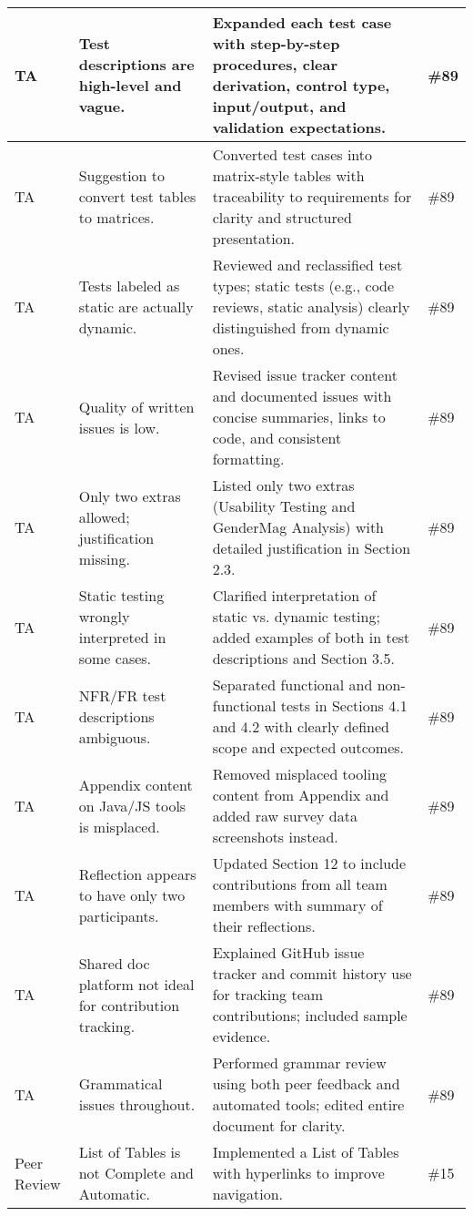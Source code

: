 \documentclass{article}
\begin{document}
\begin{longtable}{|p{2cm}|p{5cm}|p{5cm}|p{2cm}|}
\hline
TA & Test descriptions are high-level and vague. & Expanded each test case with step-by-step procedures, clear derivation, control type, input/output, and validation expectations. & \#89 \\
\hline
TA & Suggestion to convert test tables to matrices. & Converted test cases into matrix-style tables with traceability to requirements for clarity and structured presentation. & \#89 \\
\hline
TA & Tests labeled as static are actually dynamic. & Reviewed and reclassified test types; static tests (e.g., code reviews, static analysis) clearly distinguished from dynamic ones. & \#89 \\
\hline
TA & Quality of written issues is low. & Revised issue tracker content and documented issues with concise summaries, links to code, and consistent formatting. & \#89 \\
\hline
TA & Only two extras allowed; justification missing. & Listed only two extras (Usability Testing and GenderMag Analysis) with detailed justification in Section 2.3. & \#89 \\
\hline
TA & Static testing wrongly interpreted in some cases. & Clarified interpretation of static vs. dynamic testing; added examples of both in test descriptions and Section 3.5. & \#89 \\
\hline
TA & NFR/FR test descriptions ambiguous. & Separated functional and non-functional tests in Sections 4.1 and 4.2 with clearly defined scope and expected outcomes. & \#89 \\
\hline
TA & Appendix content on Java/JS tools is misplaced. & Removed misplaced tooling content from Appendix and added raw survey data screenshots instead. & \#89 \\
\hline
TA & Reflection appears to have only two participants. & Updated Section 12 to include contributions from all team members with summary of their reflections. & \#89 \\
\hline
TA & Shared doc platform not ideal for contribution tracking. & Explained GitHub issue tracker and commit history use for tracking team contributions; included sample evidence. & \#89 \\
\hline
TA & Grammatical issues throughout. & Performed grammar review using both peer feedback and automated tools; edited entire document for clarity. & \#89 \\
\hline
Peer Review & List of Tables is not Complete and Automatic. & Implemented a List of Tables with hyperlinks to improve navigation. & \#15 \\

\end{longtable}
\end{document}
